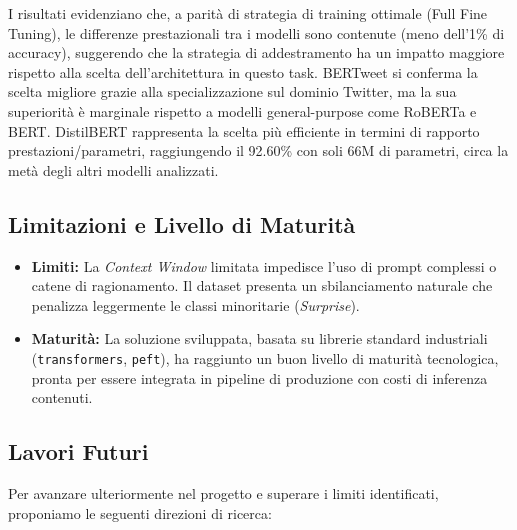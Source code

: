 \documentclass[a4paper,12pt]{article}
\begin{document}
I risultati evidenziano che, a parità di strategia di training ottimale (Full Fine Tuning), le differenze
prestazionali tra i modelli sono contenute (meno dell'1\% di accuracy), suggerendo che la strategia di
addestramento ha un impatto maggiore rispetto alla scelta dell'architettura in questo task.
BERTweet si conferma la scelta migliore grazie alla specializzazione sul dominio Twitter, ma la sua superiorità
è marginale rispetto a modelli general-purpose come RoBERTa e BERT.
DistilBERT rappresenta la scelta più efficiente in termini di rapporto prestazioni/parametri,
raggiungendo il 92.60\% con soli 66M di parametri, circa la metà degli altri modelli analizzati.

\subsection{Limitazioni e Livello di Maturità}
\begin{itemize}
    \item \textbf{Limiti:} La \textit{Context Window} limitata impedisce l'uso di prompt complessi o catene di ragionamento.
          Il dataset presenta un sbilanciamento naturale che penalizza leggermente le classi minoritarie (\textit{Surprise}).
    \item \textbf{Maturità:} La soluzione sviluppata, basata su librerie standard industriali (\texttt{transformers}, \texttt{peft}),
          ha raggiunto un buon livello di maturità tecnologica, pronta per essere integrata in pipeline di produzione con costi
          di inferenza contenuti.
\end{itemize}

\subsection{Lavori Futuri}
Per avanzare ulteriormente nel progetto e superare i limiti identificati, proponiamo le seguenti direzioni di ricerca:
\end{document}
